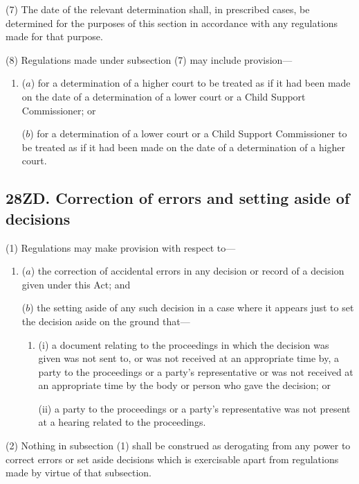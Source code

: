 \documentclass[12pt,a4paper]{article}
\begin{document}
(7) The date of the relevant determination shall, in prescribed cases, be determined for the purposes of this section in accordance with any regulations made for that purpose.

(8) Regulations made under subsection (7) may include provision—
\begin{enumerate}\item[]
($a$) for a determination of a higher court to be treated as if it had been made on the date of a determination of a lower court or a Child Support Commissioner; or

($b$) for a determination of a lower court or a Child Support Commissioner to be treated as if it had been made on the date of a determination of a higher court.
\end{enumerate}


\subsection{28ZD. Correction of errors and setting aside of decisions}

(1) Regulations may make provision with respect to—
\begin{enumerate}\item[]
($a$) the correction of accidental errors in any decision or record of a decision given under this Act; and

($b$) the setting aside of any such decision in a case where it appears just to set the decision aside on the ground that—
\begin{enumerate}\item[]
(i) a document relating to the proceedings in which the decision was given was not sent to, or was not received at an appropriate time by, a party to the proceedings or a party’s representative or was not received at an appropriate time by the body or person who gave the decision; or

(ii) a party to the proceedings or a party’s representative was not present at a hearing related to the proceedings.
\end{enumerate}
\end{enumerate}

(2) Nothing in subsection (1) shall be construed as derogating from any power to correct errors or set aside decisions which is exercisable apart from regulations made by virtue of that subsection.
\end{document}
